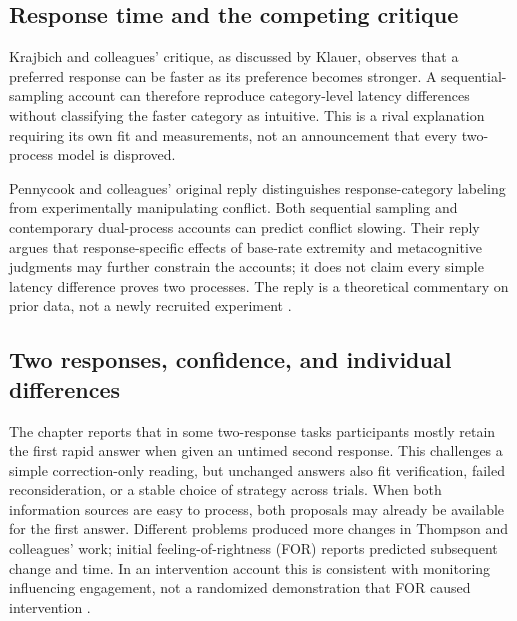 \subsection{Response time and the competing critique}

Krajbich and colleagues' critique, as discussed by Klauer, observes that
a preferred response can be faster as its preference becomes stronger.
A sequential-sampling account can therefore reproduce category-level
latency differences without classifying the faster category as intuitive.
This is a rival explanation requiring its own fit and measurements,
not an announcement that every two-process model is disproved.

Pennycook and colleagues' original reply distinguishes response-category
labeling from experimentally manipulating conflict. Both sequential
sampling and contemporary dual-process accounts can predict conflict
slowing. Their reply argues that response-specific effects of base-rate
extremity and metacognitive judgments may further constrain the accounts;
it does not claim every simple latency difference proves two processes.
The reply is a theoretical commentary on prior data, not a newly
recruited experiment \cite{PennycookEtAl2016RTCommentary}.

\subsection{Two responses, confidence, and individual differences}

The chapter reports that in some two-response tasks participants mostly
retain the first rapid answer when given an untimed second response.
This challenges a simple correction-only reading, but unchanged answers
also fit verification, failed reconsideration, or a stable choice of
strategy across trials. When both information sources are easy to
process, both proposals may already be available for the first answer.
Different problems produced more changes in Thompson and colleagues'
work; initial feeling-of-rightness (FOR) reports predicted subsequent
change and time. In an intervention account this is consistent with
monitoring influencing engagement, not a randomized demonstration that
FOR caused intervention \cite[p.~179]{Klauer2021DualProcess}.


